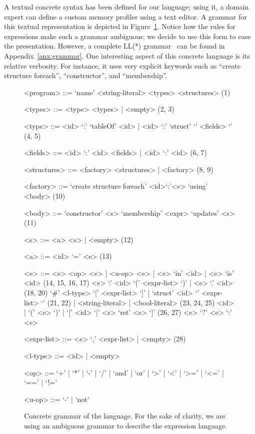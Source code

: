 A textual concrete syntax has been defined for our language; using it, a domain expert can define a custom memory profiler using a text editor.
A grammar for this textual representation is depicted in Figure~\ref{fig:dsl-grammar}.
Notice how the rules for expressions make such a grammar ambiguous; we decide to use this form to ease the presentation.
However, a complete LL(*) grammar~\cite{Parr:2011:LFA:1993498.1993548} can be found in Appendix~\ref{anx:grammar}.
One interesting aspect of this concrete language is its relative verbosity.
For instance, it uses very explicit keywords such as ``create structure foreach'', ``constructor'', and ``membership''.


{
\scriptsize
\begin{figure}[!ht]
\begin{mdframed}[outermargin=0.2cm, innermargin=0.5cm]

\newcommand{\grule}[1]{\hfill{\scriptsize (#1)}}
\setlength{\grammarindent}{4em}
\begin{grammar}

<program> ::=  `name' <string-literal> <types> <structures> \grule{1}

<types> ::= <type> <types> | <empty> \grule{2, 3}

<type> ::= <id> `:' `tableOf' <id> | <id> `:' `struct' `{' <fields> `}' \grule{4, 5}

<fields> ::= <id> `:' <id> <fields> | <id> `:' <id> \grule{6, 7}

<structures> ::= <factory> <structures> | <factory> \grule{8, 9}

<factory> ::= `create structure foreach' <id>`:'<e> `using' <body> \grule{10}

<body> ::= `constructor' <s> `membership' <expr> `updates' <s> \grule{11}

<s> ::= <a> <s> | <empty> \grule{12}

<a> ::= <id> `=' <e>  \grule{13} 

<e> ::= <e> <op> <e> | <u-op> <e> | <e> `in' <id> | <e> `is' <id> \grule{14, 15, 16, 17}
\alt <e> `.' <id> `(' <expr-list> `)' | <e> `.' <id> \grule{18, 20}
\alt `#' <l-type> `[' <expr-list> `]' | `struct' <id> `{' <expr-list> `}' \grule{21, 22}
 | <string-literal> | <bool-literal> \grule{23, 24, 25}
\alt <id> | `(' <e> `)' | `[' <id> `|' <s> `ret' <e> `]' \grule{26, 27}
\alt <e> `?' <e> `:' <e>

<expr-list> ::= <e> `,' <expr-list> | <empty>  \grule{28}

<l-type> ::= <id> | <empty>

<op> ::= `+' | `*' | `-' | `/' | `and' | `or' | `>' | `<' | `>=' | `<=' | `==' | `!='

<u-op> ::= `-' | `not'

\end{grammar}
\end{mdframed}
\caption{Concrete grammar of the language. For the sake of clarity, we are using an ambiguous grammar to describe the expression language.} \label{fig:dsl-grammar}
\end{figure}
}


